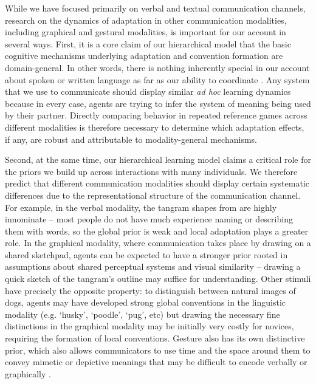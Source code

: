 While we have focused primarily on verbal and textual communication channels, research on the dynamics of adaptation in other communication modalities, including graphical \cite{GarrodFayLeeOberlanderMacLeod07_GraphicalSymbolSystems,TheisenEtAl10_SystematicityArbitrariness,hawkins2019disentangling} and gestural \cite{FayListerEllisonGoldinMeadow13_GestureBeatsVocalization,bohn2019young} modalities, is important for our account in several ways.
First, it is a core claim of our hierarchical model that the basic cognitive mechanisms underlying adaptation and convention formation are domain-general.
In other words, there is nothing inherently special in our account about spoken or written language as far as our ability to coordinate . 
Any system that we use to communicate should display similar \emph{ad hoc} learning dynamics because in every case, agents are trying to infer the system of meaning being used by their partner.
Directly comparing behavior in repeated reference games across different modalities is therefore necessary to determine which adaptation effects, if any, are robust and attributable to modality-general mechanisms.

Second, at the same time, our hierarchical learning model claims a critical role for the priors we build up across interactions with many individuals.
We therefore predict that different communication modalities should display certain systematic differences due to the representational structure of the communication channel.
For example, in the verbal modality, the tangram shapes from \cite{ClarkWilkesGibbs86_ReferringCollaborative} are highly innominate -- most people do not have much experience naming or describing them with words, so the global prior is weak and local adaptation plays a greater role.
In the graphical modality, where communication takes place by drawing on a shared sketchpad, agents can be expected to have a stronger prior rooted in assumptions about shared perceptual systems and visual similarity \cite{fan2018common} -- drawing a quick sketch of the tangram's outline may suffice for understanding.
Other stimuli have precisely the opposite property: to distinguish between natural images of dogs, agents may have developed strong global conventions in the linguistic modality (e.g. `husky', `poodle', `pug', etc) but drawing the necessary fine distinctions in the graphical modality may be initially very costly for novices, requiring the formation of local conventions. 
Gesture also has its own distinctive prior, which also allows communicators to use time and the space around them to convey mimetic or depictive meanings that may be difficult to encode verbally or graphically \cite{goldin-meadow_role_1999,clark2016depicting,mcneill1992hand}. 

